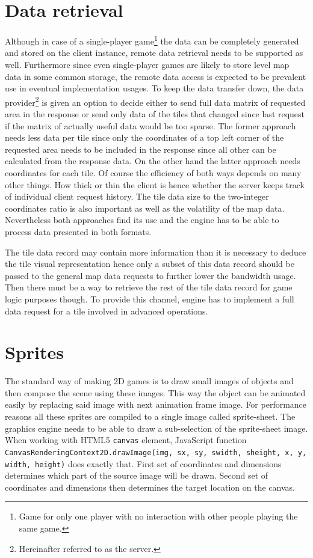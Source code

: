 \documentclass[11pt,oneside, final]{fithesis2}
\begin{document}
\section{Data retrieval}
\label{datadesign}
Although in case of a single-player game\footnote{Game for only one player with no interaction with other people playing the same game.} the data can be completely generated and stored on the client instance, remote data retrieval needs to be supported as well. Furthermore since even single-player games are likely to store level map data in some common storage, the remote data access is expected to be prevalent use in eventual implementation usages. To keep the data transfer down, the data provider\footnote{Hereinafter referred to as the server.} is given an option to decide either to send full data matrix of requested area in the response or send only data of the tiles that changed since last request if the matrix of actually useful data would be too sparse. The former approach needs less data per tile since only the coordinates of a top left corner of the requested area needs to be included in the response since all other can be calculated from the response data. On the other hand the latter approach needs coordinates for each tile. Of course the efficiency of both ways depends on many other things. How thick or thin the client is hence whether the server keeps track of individual client request history. The tile data size to the two-integer coordinates ratio is also important as well as the volatility of the map data. Nevertheless both approaches find its use and the engine has to be able to process data presented in both formats.

The tile data record may contain more information than it is necessary to deduce the tile visual representation hence only a subset of this data record should be passed to the general map data requests to further lower the bandwidth usage. Then there must be a way to retrieve the rest of the tile data record for game logic purposes though. To provide this channel, engine has to implement a full data request for a tile involved in advanced operations.

\section{Sprites}
The standard way of making 2D games is to draw small images of objects and then compose the scene using these images. This way the object can be animated easily by replacing said image with next animation frame image. For performance reasons all these sprites are compiled to a single image called sprite-sheet.\cite{pagella} The graphics engine needs to be able to draw a sub-selection of the sprite-sheet image. When working with HTML5 \texttt{canvas} element, JavaScript function \texttt{CanvasRenderingContext2D.drawImage(img, sx, sy, swidth, sheight, x, y, width, height)} does exactly that\cite{canvasdrawimage}. First set of coordinates and dimensions determines which part of the source image will be drawn. Second set of coordinates and dimensions then determines the target location on the canvas.
\end{document}
